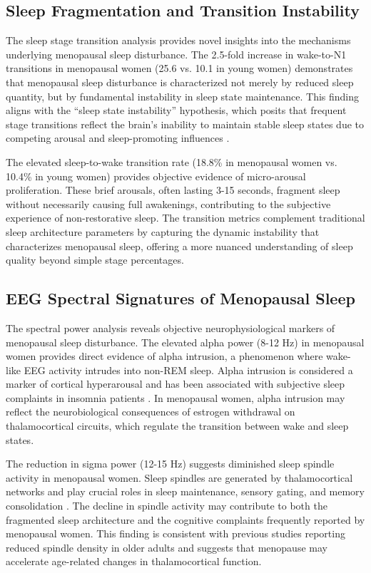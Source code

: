 \documentclass[a4paper,fleqn]{cas-dc}
\begin{document}
\subsection{Sleep Fragmentation and Transition Instability}

The sleep stage transition analysis provides novel insights into the mechanisms underlying menopausal sleep disturbance. The 2.5-fold increase in wake-to-N1 transitions in menopausal women (25.6 vs. 10.1 in young women) demonstrates that menopausal sleep disturbance is characterized not merely by reduced sleep quantity, but by fundamental instability in sleep state maintenance. This finding aligns with the ``sleep state instability'' hypothesis, which posits that frequent stage transitions reflect the brain's inability to maintain stable sleep states due to competing arousal and sleep-promoting influences \cite{Perlis2002}.

The elevated sleep-to-wake transition rate (18.8\% in menopausal women vs. 10.4\% in young women) provides objective evidence of micro-arousal proliferation. These brief arousals, often lasting 3-15 seconds, fragment sleep without necessarily causing full awakenings, contributing to the subjective experience of non-restorative sleep. The transition metrics complement traditional sleep architecture parameters by capturing the dynamic instability that characterizes menopausal sleep, offering a more nuanced understanding of sleep quality beyond simple stage percentages.

\subsection{EEG Spectral Signatures of Menopausal Sleep}

The spectral power analysis reveals objective neurophysiological markers of menopausal sleep disturbance. The elevated alpha power (8-12 Hz) in menopausal women provides direct evidence of alpha intrusion, a phenomenon where wake-like EEG activity intrudes into non-REM sleep. Alpha intrusion is considered a marker of cortical hyperarousal and has been associated with subjective sleep complaints in insomnia patients \cite{Kravitz2011}. In menopausal women, alpha intrusion may reflect the neurobiological consequences of estrogen withdrawal on thalamocortical circuits, which regulate the transition between wake and sleep states.

The reduction in sigma power (12-15 Hz) suggests diminished sleep spindle activity in menopausal women. Sleep spindles are generated by thalamocortical networks and play crucial roles in sleep maintenance, sensory gating, and memory consolidation \cite{Ferrarelli2007}. The decline in spindle activity may contribute to both the fragmented sleep architecture and the cognitive complaints frequently reported by menopausal women. This finding is consistent with previous studies reporting reduced spindle density in older adults and suggests that menopause may accelerate age-related changes in thalamocortical function.
\end{document}
